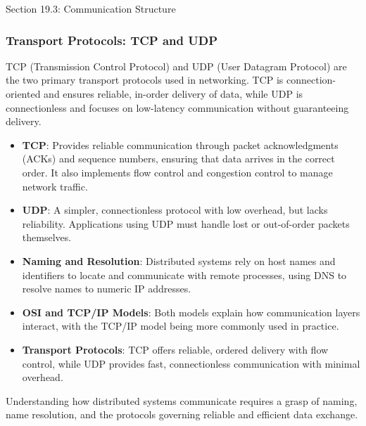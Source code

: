 \begin{notes}{Section 19.3: Communication Structure}
    \subsubsection*{Transport Protocols: TCP and UDP}
    
    TCP (Transmission Control Protocol) and UDP (User Datagram Protocol) are the two primary transport protocols used in networking. TCP is connection-oriented and ensures reliable, in-order delivery 
    of data, while UDP is connectionless and focuses on low-latency communication without guaranteeing delivery.
    
    \begin{highlight}
    
        \begin{itemize}
            \item \textbf{TCP}: Provides reliable communication through packet acknowledgments (ACKs) and sequence numbers, ensuring that data arrives in the correct order. It also implements flow 
            control and congestion control to manage network traffic.
            \item \textbf{UDP}: A simpler, connectionless protocol with low overhead, but lacks reliability. Applications using UDP must handle lost or out-of-order packets themselves.
        \end{itemize}
    
    \end{highlight}
    
    \begin{highlight}
    
        \begin{itemize}
            \item \textbf{Naming and Resolution}: Distributed systems rely on host names and identifiers to locate and communicate with remote processes, using DNS to resolve names to numeric IP addresses.
            \item \textbf{OSI and TCP/IP Models}: Both models explain how communication layers interact, with the TCP/IP model being more commonly used in practice.
            \item \textbf{Transport Protocols}: TCP offers reliable, ordered delivery with flow control, while UDP provides fast, connectionless communication with minimal overhead.
        \end{itemize}
    
    Understanding how distributed systems communicate requires a grasp of naming, name resolution, and the protocols governing reliable and efficient data exchange.
    
    \end{highlight}
\end{notes}

